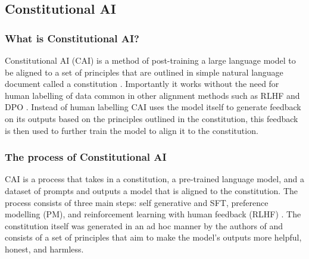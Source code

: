\subsection{Constitutional AI}

\subsubsection{What is Constitutional AI?}

Constitutional AI (CAI) is a method of post-training a large language model to be aligned to a set of principles that are outlined in simple natural language document called a constitution \cite{baiConstitutionalAIHarmlessness2022}. Importantly it works without the need for human labelling of data common in other alignment methods such as RLHF and DPO \cite{ouyangTrainingLanguageModels2022, rafailovDirectPreferenceOptimization2024}. Instead of human labelling CAI uses the model itself to generate feedback on its outputs based on the principles outlined in the constitution, this feedback is then used to further train the model to align it to the constitution.

\subsubsection{The process of Constitutional AI}

CAI is a process that takes in a constitution, a pre-trained language model, and a dataset of prompts and outputs a model that is aligned to the constitution. The process consists of three main steps: self generative and SFT, preference modelling (PM), and reinforcement learning with human feedback (RLHF) \cite{baiConstitutionalAIHarmlessness2022}. The constitution itself was generated in an ad hoc manner by the authors of \cite{baiConstitutionalAIHarmlessness2022} and consists of a set of principles that aim to make the model's outputs more helpful, honest, and harmless.


